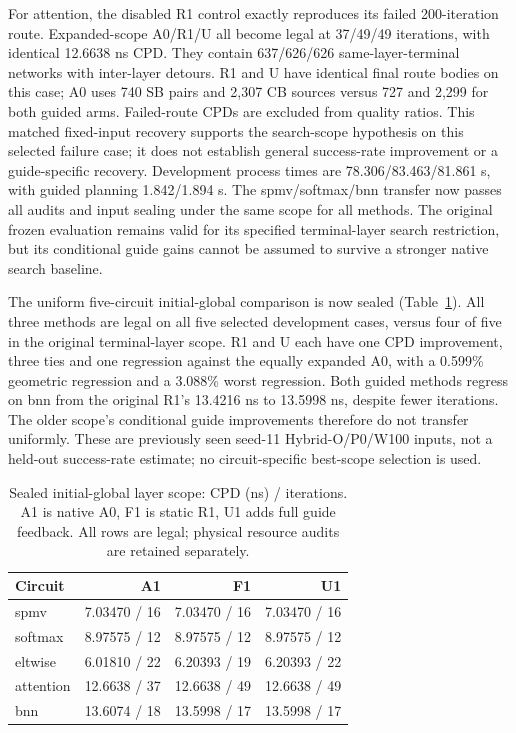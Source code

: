 \documentclass[conference,10pt]{IEEEtran}
\begin{document}
For attention, the disabled R1 control exactly reproduces its failed 200-iteration route. Expanded-scope A0/R1/U all become legal at 37/49/49 iterations, with identical 12.6638 ns CPD. They contain 637/626/626 same-layer-terminal networks with inter-layer detours. R1 and U have identical final route bodies on this case; A0 uses 740 SB pairs and 2,307 CB sources versus 727 and 2,299 for both guided arms. Failed-route CPDs are excluded from quality ratios. This matched fixed-input recovery supports the search-scope hypothesis on this selected failure case; it does not establish general success-rate improvement or a guide-specific recovery. Development process times are 78.306/83.463/81.861 s, with guided planning 1.842/1.894 s. The spmv/softmax/bnn transfer now passes all audits and input sealing under the same scope for all methods. The original frozen evaluation remains valid for its specified terminal-layer search restriction, but its conditional guide gains cannot be assumed to survive a stronger native search baseline.

The uniform five-circuit initial-global comparison is now sealed (Table~\ref{tab:scope5}). All three methods are legal on all five selected development cases, versus four of five in the original terminal-layer scope. R1 and U each have one CPD improvement, three ties and one regression against the equally expanded A0, with a 0.599\% geometric regression and a 3.088\% worst regression. Both guided methods regress on bnn from the original R1's 13.4216 ns to 13.5998 ns, despite fewer iterations. The older scope's conditional guide improvements therefore do not transfer uniformly. These are previously seen seed-11 Hybrid-O/P0/W100 inputs, not a held-out success-rate estimate; no circuit-specific best-scope selection is used.

\begin{table}[t]
\centering\small
\caption{Sealed initial-global layer scope: CPD (ns) / iterations. A1 is native A0, F1 is static R1, U1 adds full guide feedback. All rows are legal; physical resource audits are retained separately.}
\label{tab:scope5}
\begin{tabular}{lrrr}\hline
Circuit & A1 & F1 & U1 \\ \hline
spmv & 7.03470 / 16 & 7.03470 / 16 & 7.03470 / 16 \\
softmax & 8.97575 / 12 & 8.97575 / 12 & 8.97575 / 12 \\
eltwise & 6.01810 / 22 & 6.20393 / 19 & 6.20393 / 22 \\
attention & 12.6638 / 37 & 12.6638 / 49 & 12.6638 / 49 \\
bnn & 13.6074 / 18 & 13.5998 / 17 & 13.5998 / 17 \\
\hline\end{tabular}
\end{table}
\end{document}
